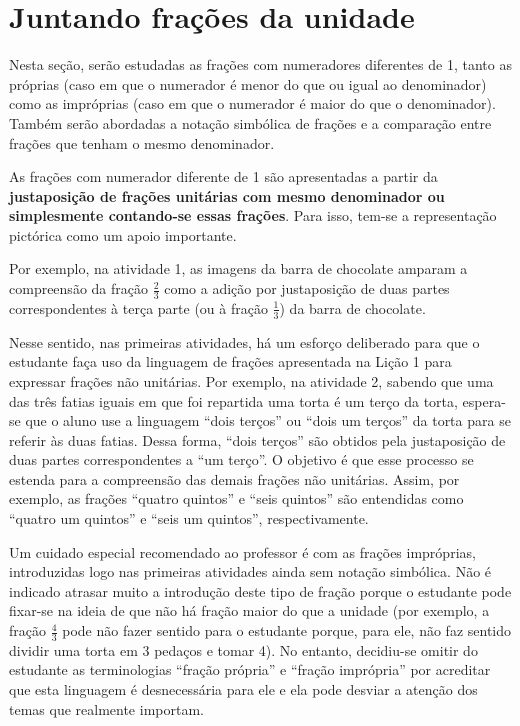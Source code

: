 \documentclass[oneside]{book}
\begin{document}
\setcounter{chapter}{1}
\chapter{Juntando frações da unidade}
Nesta seção, serão estudadas as frações com numeradores diferentes de 1, tanto as próprias (caso em que o numerador é menor do que ou igual ao denominador) como as impróprias (caso em que o numerador é maior do que o denominador).
Também serão abordadas a notação simbólica de frações e a comparação entre frações que tenham o mesmo denominador. 

As frações com numerador diferente de 1 são apresentadas a partir da {\bf justaposição de frações unitárias com mesmo denominador ou simplesmente contando-se essas frações}. Para isso, tem-se a representação pictórica como um apoio importante. 

Por exemplo, na atividade 1, as imagens da barra de chocolate amparam a compreensão da fração $\frac{2}{3}$ como a adição por justaposição de duas partes correspondentes à terça parte (ou à fração $\frac{1}{3}$) da barra de chocolate.

Nesse sentido, nas primeiras atividades, há um esforço deliberado para que o estudante faça uso da linguagem de frações apresentada na Lição 1 para expressar frações não unitárias. Por exemplo, na atividade 2, sabendo que uma das três fatias iguais em que foi repartida uma torta é um terço da torta, espera-se que o aluno use a linguagem ``dois terços'' ou ``dois um terços'' da torta para se referir às duas fatias. Dessa forma, ``dois terços'' são obtidos pela justaposição de duas partes correspondentes a ``um terço''. O objetivo é que esse processo se estenda para a compreensão das demais frações não unitárias. Assim, por exemplo, as frações ``quatro quintos'' e ``seis quintos'' são entendidas como ``quatro um quintos'' e ``seis um quintos'', respectivamente.

Um cuidado especial recomendado ao professor é com as frações impróprias, introduzidas logo nas primeiras atividades ainda sem notação simbólica. Não é indicado atrasar muito a introdução deste tipo de fração porque o estudante pode fixar-se na ideia de que não há fração maior do que a unidade  (por exemplo, a fração $\frac{4}{3}$ pode não fazer sentido para o estudante porque, para ele, não faz sentido dividir uma torta em 3 pedaços e tomar 4). No entanto, decidiu-se omitir do estudante as terminologias ``fração própria'' e ``fração imprópria'' por acreditar que esta linguagem é desnecessária para ele e ela pode desviar a atenção dos temas que realmente importam.
\end{document}
